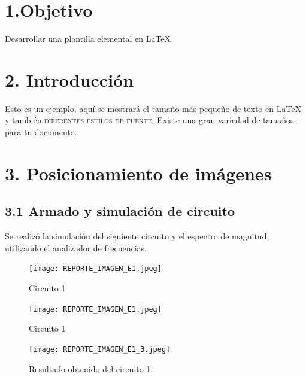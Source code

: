 \documentclass[11pt]{article} %
\begin{document}
    \newpage

     \newpage
     \section*{1.Objetivo}
         \Large{Desarrollar una plantilla elemental en \LaTeX}
     
     \section*{2. Introducción}
         \Large{Esto es un ejemplo, {\tiny aquí se mostrará el tamaño más pequeño de texto en \LaTeX} y también \textsc{diferentes estilos de fuente}}. Existe una {\huge gran variedad de tamaños} para tu documento.
     
     \section*{3. Posicionamiento de im\'agenes}
         \subsection*{3.1 Armado y simulación de circuito}
         Se realizó la simulación del siguiente circuito y el espectro de magnitud, utilizando el analizador de frecuencias.
         \begin{figure}[htbp]
             \centering
             \texttt{[image: REPORTE\_IMAGEN\_E1.jpeg]}
             \caption{Circuito 1}
         \end{figure}
         
         \begin{figure}
             \centering
             {\texttt{[image: REPORTE\_IMAGEN\_E1.jpeg]}}
             \caption{Circuito 1}
         \end{figure}
         
         \begin{figure}
             \centering
             {\texttt{[image: REPORTE\_IMAGEN\_E1\_3.jpeg]}}
             \caption{Resultado obtenido del circuito 1.}
         \end{figure}
     
\end{document}
